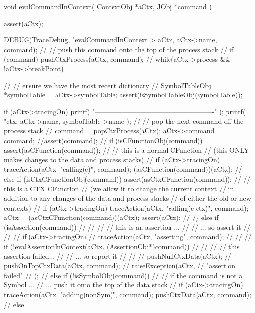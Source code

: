 \startCCode
void evalCommandInContext(
  ContextObj *aCtx,
  JObj       *command
) {
  assert(aCtx);
  
  DEBUG(TraceDebug, "evalCommandInContext > %
    aCtx, aCtx->name, command);
  //
  // push this command onto the top of the process stack
  //
  if (command) pushCtxProcess(aCtx, command);
  //
  while(aCtx->process && !aCtx->breakPoint) {
    //
    // ensure we have the most recent dictionary
    //
    SymbolTableObj *symbolTable = aCtx->symbolTable;
    assert(isSymbolTableObj(symbolTable));
    
    if (aCtx->tracingOn) {
      printf(
        "\n----------------------------------------------------\n"
      );
      printf(
        "ctx: %
        aCtx->name, symbolTable->name
      );
    }
    //
    // pop the next command off the process stack
    //
    command = popCtxProcess(aCtx);
    aCtx->command = command;
    //assert(command);
    //
    if (isCFunctionObj(command)) {
      assert(asCFunction(command));
      //
      // this is a normal CFunction
      // (this ONLY makes changes to the data and process stacks)
      //
      if (aCtx->tracingOn)
        traceAction(aCtx, "calling(c)", command);
      (asCFunction(command))(aCtx);
      //
    } else if (isCtxCFunctionObj(command)) {
        assert(asCtxCFunction(command));
        //
        // this is a CTX CFunction
        // (we allow it to change the current context
        //  in addition to any changes of the data and process stacks
        //  of either the old or new contexts)
        //
        if (aCtx->tracingOn) 
          traceAction(aCtx, "calling(c-ctx)", command);
        aCtx = (asCtxCFunction(command))(aCtx);
        assert(aCtx);
        //    
//    } else if (isAssertion(command)) {
//      //
//      // this is an assertion ...
//      //   ... so assert it 
//      //
//      if (aCtx->tracingOn) 
//        traceAction(aCtx, "asserting", command);
//      //
//      if (!evalAssertionInContext(aCtx, (AssertionObj*)command)) {
//        //
//        // this assertion failed... 
//        //   ... so report it
//        //
//        pushNullCtxData(aCtx);
//        pushOnTopCtxData(aCtx, command);
//        raiseException(aCtx,
//          "assertion failed"
//        );
//      }
    } else if (!isSymbolObj(command)) {
      //
      // if the command is not a Symbol ...
      //  ...  push it onto the top of the data stack
      //
      if (aCtx->tracingOn)
        traceAction(aCtx, "adding(nonSym)", command);
      pushCtxData(aCtx, command);
      //
   } else {
}}}
